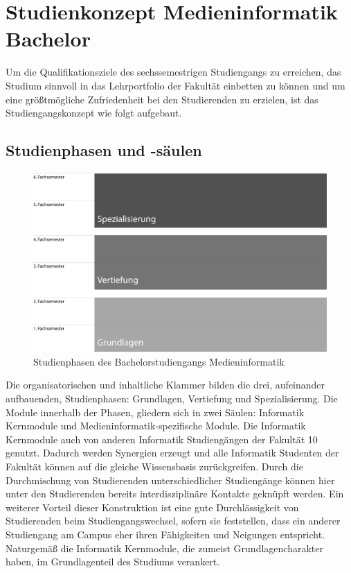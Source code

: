 \section{Studienkonzept Medieninformatik
Bachelor}\label{studienkonzept-medieninformatik-bachelor}

Um die Qualifikationsziele des sechssemestrigen Studiengangs zu
erreichen, das Studium sinnvoll in das Lehrportfolio der Fakultät
einbetten zu können und um eine größtmögliche Zufriedenheit bei den
Studierenden zu erzielen, ist das Studiengangskonzept wie folgt
aufgebaut.

\subsection{Studienphasen und
-säulen}\label{studienphasen-und--suxe4ulen}

\begin{figure}[htbp]
\centering
\includegraphics[width=\columnwidth]{../anhaenge/bilder/ba-studienphasen.png}
\caption{Studienphasen des Bachelorstudiengangs Medieninformatik}
\end{figure}

Die organisatorischen und inhaltliche Klammer bilden die drei,
aufeinander aufbauenden, Studienphasen: Grundlagen, Vertiefung und
Spezialisierung. Die Module innerhalb der Phasen, gliedern sich in zwei
Säulen: Informatik Kernmodule und Medieninformatik-spezifische Module.
Die Informatik Kernmodule auch von anderen Informatik Studiengängen der
Fakultät 10 genutzt. Dadurch werden Synergien erzeugt und alle
Informatik Studenten der Fakultät können auf die gleiche Wissensbasis
zurückgreifen. Durch die Durchmischung von Studierenden
unterschiedlicher Studiengänge können hier unter den Studierenden
bereits interdisziplinäre Kontakte geknüpft werden. Ein weiterer Vorteil
dieser Konstruktion ist eine gute Durchlässigkeit von Studierenden beim
Studiengangswechsel, sofern sie feststellen, dass ein anderer
Studiengang am Campus eher ihren Fähigkeiten und Neigungen entspricht.
Naturgemäß die Informatik Kernmodule, die zumeist Grundlagencharakter
haben, im Grundlagenteil des Studiums verankert.

